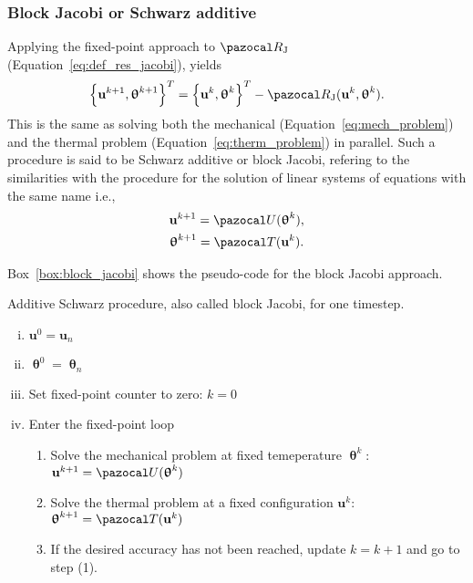 \subsubsection{Block Jacobi or Schwarz additive}

Applying the fixed-point approach to \(\pazocal R_\mathrm{J}\) (Equation~\eqref{eq:def_res_jacobi}), yields
\begin{equation}
  \left\{\mathbf u^{k+1}, \bm\uptheta^{k+1}\right\}^T = \left\{\mathbf u^k, \bm\uptheta^k\right\}^T - \pazocal R_\mathrm{J}(\mathbf u^k, \bm \uptheta^k).
\end{equation}
This is the same as solving both the mechanical (Equation~\eqref{eq:mech_problem}) and the thermal problem (Equation~\eqref{eq:therm_problem}) in parallel.
Such a procedure is said to be Schwarz additive or block Jacobi, refering to the similarities with the procedure for the solution of linear systems of equations with the same name i.e.,
\begin{gather}
\mathbf u^{k+1} = \pazocal U(\bm \uptheta^k),\\
\bm \uptheta^{k+1} = \pazocal T(\mathbf u^k).
\end{gather}

Box~\ref{box:block_jacobi} shows the pseudo-code for the block Jacobi approach.

\begin{framedbox}[htb]
  \caption{Additive Schwarz procedure, also called block Jacobi, for one timestep.}
  \label{box:block_jacobi}
  \begin{center}
    \begin{minipage}{0.9\textwidth}
    \begin{enumerate}[(i)]
    \item \(\mathbf u^0 = \mathbf u_{n}\)
    \item \(\bm \uptheta^0 = \bm \uptheta_n\)
    \item Set fixed-point counter to zero: \(k=0\)
    \item Enter the fixed-point loop
    \begin{enumerate}[(1)]
      \item Solve the mechanical problem at fixed temeperature \(\bm \uptheta^k\): \(\mathbf u^{k+1} = \pazocal U(\bm \uptheta^k)\)
      \item Solve the thermal problem at a fixed configuration \(\mathbf u^k\): \(\bm \uptheta^{k+1} = \pazocal T(\mathbf u^k)\)
      \item If the desired accuracy has not been reached, update \(k=k+1\) and go to step (1).

    \end{enumerate}
    \end{enumerate}
    \end{minipage}
  \end{center}
\end{framedbox}


